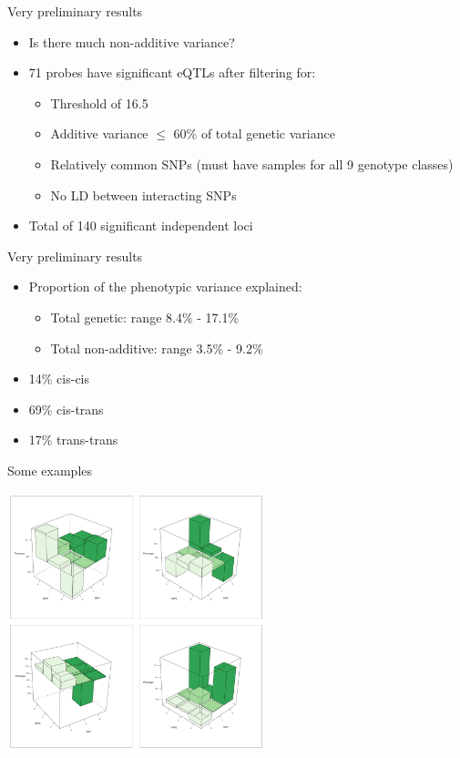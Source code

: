 \documentclass{beamer}
\begin{document}
\begin{frame}{Very preliminary results}
\begin{itemize}
\item Is there much non-additive variance?
\item 71 probes have significant eQTLs after filtering for:
\begin{itemize}
\item Threshold of 16.5
\item Additive variance $\leq$ 60\% of total genetic variance
\item Relatively common SNPs (must have samples for all 9 genotype classes)
\item No LD between interacting SNPs
\end{itemize}
\item Total of 140 significant independent loci
\end{itemize}
\end{frame}

\begin{frame}{Very preliminary results}
\begin{itemize}
\item Proportion of the phenotypic variance explained:
\begin{itemize}
\item Total genetic: range 8.4\% - 17.1\%
\item Total non-additive: range 3.5\% - 9.2\%
\end{itemize}
\item 14\% cis-cis
\item 69\% cis-trans
\item 17\% trans-trans
\end{itemize}
\end{frame}

\begin{frame}{Some examples}
\begin{center}
\includegraphics[height=7.5cm]{epistasis_examples}
\end{center}
\end{frame}
\end{document}

